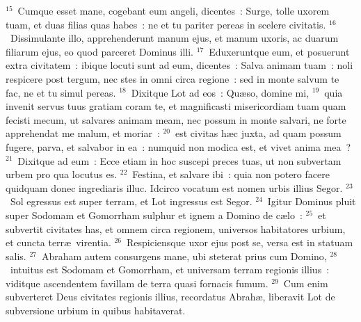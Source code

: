 ${}^{15}$~Cumque esset mane, cogebant eum angeli, dicentes~: Surge, tolle uxorem tuam, et duas filias quas habes~: ne et tu pariter pereas in scelere civitatis.
${}^{16}$~Dissimulante illo, apprehenderunt manum ejus, et manum uxoris, ac duarum filiarum ejus, eo quod parceret Dominus illi.
${}^{17}$~Eduxeruntque eum, et posuerunt extra civitatem~: ibique locuti sunt ad eum, dicentes~: Salva animam tuam~: noli respicere post tergum, nec stes in omni circa regione~: sed in monte salvum te fac, ne et tu simul pereas.
${}^{18}$~Dixitque Lot ad eos~: Qu\ae so, domine mi,
${}^{19}$~quia invenit servus tuus gratiam coram te, et magnificasti misericordiam tuam quam fecisti mecum, ut salvares animam meam, nec possum in monte salvari, ne forte apprehendat me malum, et moriar~:
${}^{20}$~est civitas h\ae c juxta, ad quam possum fugere, parva, et salvabor in ea~: numquid non modica est, et vivet anima mea~?
${}^{21}$~Dixitque ad eum~: Ecce etiam in hoc suscepi preces tuas, ut non subvertam urbem pro qua locutus es.
${}^{22}$~Festina, et salvare ibi~: quia non potero facere quidquam donec ingrediaris illuc. Idcirco vocatum est nomen urbis illius Segor.
${}^{23}$~Sol egressus est super terram, et Lot ingressus est Segor.
${}^{24}$~Igitur Dominus pluit super Sodomam et Gomorrham sulphur et ignem a Domino de c\ae lo~:
${}^{25}$~et subvertit civitates has, et omnem circa regionem, universos habitatores urbium, et cuncta terr\ae\ virentia.
${}^{26}$~Respiciensque uxor ejus post se, versa est in statuam salis.
${}^{27}$~Abraham autem consurgens mane, ubi steterat prius cum Domino,
${}^{28}$~intuitus est Sodomam et Gomorrham, et universam terram regionis illius~: viditque ascendentem favillam de terra quasi fornacis fumum.
${}^{29}$~Cum enim subverteret Deus civitates regionis illius, recordatus Abrah\ae , liberavit Lot de subversione urbium in quibus habitaverat.



